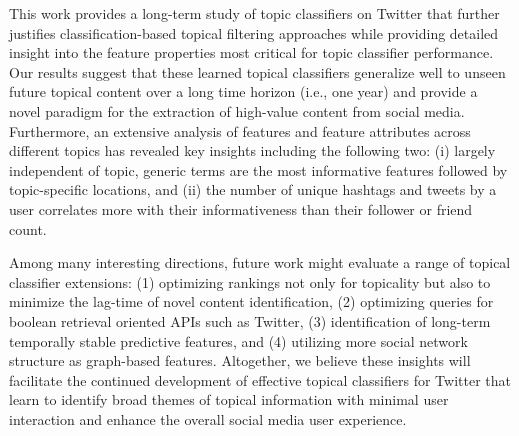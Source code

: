 
This work provides a long-term study of topic classifiers on Twitter that further justifies classification-based topical filtering approaches while providing detailed insight into the feature properties most critical for topic classifier performance.
%
Our results suggest that these learned topical classifiers generalize well
to unseen future topical content over a long time horizon (i.e., one year)
and provide a novel paradigm for the
extraction of high-value content from social media. Furthermore, an
extensive analysis of features and feature attributes across different
topics has revealed key insights including the following two: 
(i) largely independent of
topic, generic terms are the most informative features followed by
topic-specific locations, and (ii) the number of unique hashtags and
tweets by a user correlates more with their informativeness than their
follower or friend count.

Among many interesting directions, future work might evaluate a range of 
topical classifier extensions: (1)
optimizing rankings not only for topicality but also to minimize the
lag-time of novel content identification, (2) optimizing queries for
boolean retrieval oriented APIs such as Twitter, (3) identification of 
long-term temporally stable predictive features, and (4) utilizing
more social network structure as graph-based 
features.  Altogether, we believe these insights will facilitate 
the continued development of effective topical classifiers for Twitter that learn to
identify broad themes of topical information with minimal user
interaction and enhance the overall social media user experience.
